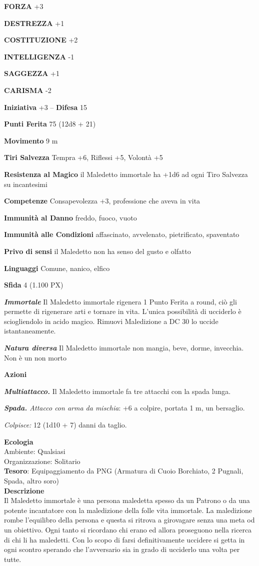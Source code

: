 \begin{multicols}{2}
	\textbf{FORZA} +3

	\textbf{DESTREZZA} +1

	\textbf{COSTITUZIONE} +2

	\textbf{INTELLIGENZA} -1

	\textbf{SAGGEZZA} +1

	\textbf{CARISMA} -2

	\textbf{Iniziativa} +3 -- \textbf{Difesa} 15

	\textbf{Punti Ferita} 75 (12d8 + 21)

	\textbf{Movimento} 9 m

	\textbf{Tiri Salvezza} Tempra +6, Riflessi +5, Volontà +5

	\textbf{Resistenza al Magico} il Maledetto immortale ha +1d6 ad ogni Tiro Salvezza su incantesimi

	\textbf{Competenze} Consapevolezza +3, professione che aveva in vita

	\textbf{Immunità al Danno} freddo, fuoco, vuoto

	\textbf{Immunità alle Condizioni} affascinato, avvelenato, pietrificato, spaventato

	\textbf{Privo di sensi} il Maledetto non ha senso del gusto e olfatto

	\textbf{Linguaggi} Comune, nanico, elfico

	\textbf{Sfida} 4 (1.100 PX)

	\textit{\textbf{Immortale}} Il Maledetto immortale rigenera 1 Punto Ferita a round, ciò gli permette di rigenerare arti e tornare in vita. L'unica possibilità di ucciderlo è sciogliendolo in acido magico. Rimuovi Maledizione a DC 30 lo uccide istantaneamente.

	\textit{\textbf{Natura diversa}} Il Maledetto immortale non mangia, beve, dorme, invecchia. Non è un non morto

	\textbf{Azioni}

	\textit{\textbf{Multiattacco.}} Il Maledetto immortale fa tre attacchi con la spada lunga.

	\textit{\textbf{Spada.} Attacco con arma da mischia}: +6 a colpire, portata 1 m, un bersaglio.

	\textit{Colpisce:} 12 (1d10 + 7) danni da taglio.

	\textbf{Ecologia}\\
	Ambiente: Qualsiasi\\
	Organizzazione: Solitario\\
	\textbf{Tesoro}: Equipaggiamento da PNG (Armatura di Cuoio Borchiato, 2 Pugnali, Spada, altro soro)\\
	\textbf{Descrizione}\\
	Il Maledetto immortale è una persona maledetta spesso da un Patrono o da una potente incantatore con la maledizione della folle vita immortale. La maledizione rombe l'equilibro della persona e questa si ritrova a girovagare senza una meta od un obiettivo. Ogni tanto si ricordano chi erano ed allora proseguono nella ricerca di chi li ha maledetti.
	Con lo scopo di farsi definitivamente uccidere si getta in ogni scontro sperando che l'avversario sia in grado di ucciderlo una volta per tutte.



\end{multicols}
